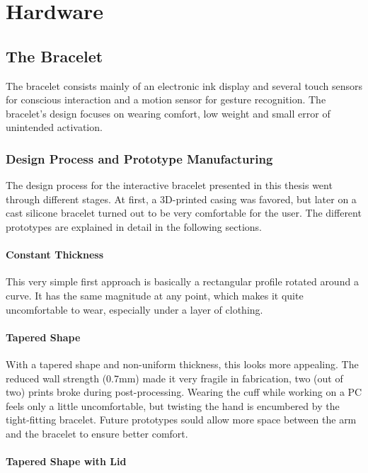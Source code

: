 \chapter{Hardware}

\section{The Bracelet}

The bracelet consists mainly of an electronic ink display and several touch sensors for conscious interaction and a motion sensor for gesture recognition. The bracelet's design focuses on wearing comfort, low weight and small error of unintended activation.

\subsection{Design Process and Prototype Manufacturing}

The design process for the interactive bracelet presented in this thesis went through different stages. At first, a 3D-printed casing was favored, but later on a cast silicone bracelet turned out to be very comfortable for the user. The different prototypes are explained in detail in the following sections.

\subsubsection{Constant Thickness}

This very simple first approach is basically a rectangular profile rotated around a curve. It has the same magnitude at any point, which makes it quite uncomfortable to wear, especially under a layer of clothing.

\subsubsection{Tapered Shape}

With a tapered shape and non-uniform thickness, this looks more appealing. The reduced wall strength (0.7mm) made it very fragile in fabrication, two (out of two) prints broke during post-processing. Wearing the cuff while working on a PC feels only a little uncomfortable, but twisting the hand is encumbered by the tight-fitting bracelet. Future prototypes sould allow more space between the arm and the bracelet to ensure better comfort.

\subsubsection{Tapered Shape with Lid}

